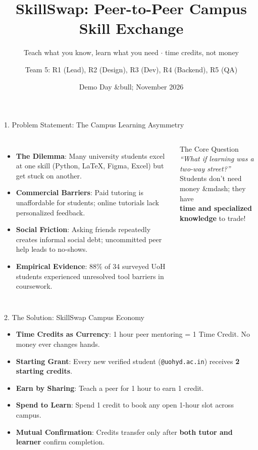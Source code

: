 \documentclass[aspectratio=169,10pt]{beamer}
\title[SkillSwap &bull; UoH IE209]{SkillSwap: Peer-to-Peer Campus Skill Exchange}
\subtitle{Teach what you know, learn what you need $\cdot$ time credits, not money}
\author[Team 5]{Team 5: R1 (Lead), R2 (Design), R3 (Dev), R4 (Backend), R5 (QA)}
\institute[SCIS, UoH]{School of Computer and Information Sciences \\ University of Hyderabad}
\date{Demo Day &bull; November 2026}
\begin{document}
\begin{frame}
  \titlepage
\end{frame}

\begin{frame}{1. Problem Statement: The Campus Learning Asymmetry}
  \begin{columns}
    \begin{itemize}
      \item \textbf{The Dilemma}: Many university students excel at one skill (Python, \LaTeX, Figma, Excel) but get stuck on another.
      \item \textbf{Commercial Barriers}: Paid tutoring is unaffordable for students; online tutorials lack personalized feedback.
      \item \textbf{Social Friction}: Asking friends repeatedly creates informal social debt; uncommitted peer help leads to no-shows.
      \item \textbf{Empirical Evidence}: 88\% of 34 surveyed UoH students experienced unresolved tool barriers in coursework.
    \end{itemize}

    \begin{block}{The Core Question}
      \centering
      \textit{``What if learning was a two-way street?''} \\
      \vspace{0.3em}
      Students don't need money &mdash; they have \\
      \textbf{time and specialized knowledge} to trade!
    \end{block}
  \end{columns}
\end{frame}

\begin{frame}{2. The Solution: SkillSwap Campus Economy}
  \begin{itemize}
    \item \textbf{Time Credits as Currency}: 1 hour peer mentoring = 1 Time Credit. No money ever changes hands.
    \item \textbf{Starting Grant}: Every new verified student (\texttt{@uohyd.ac.in}) receives \textbf{2 starting credits}.
    \item \textbf{Earn by Sharing}: Teach a peer for 1 hour to earn 1 credit.
    \item \textbf{Spend to Learn}: Spend 1 credit to book any open 1-hour slot across campus.
    \item \textbf{Mutual Confirmation}: Credits transfer only after \textbf{both tutor and learner} confirm completion.
  \end{itemize}

  \vspace{0.8em}
  \begin{center}
  \end{center}
\end{frame}
\end{document}

